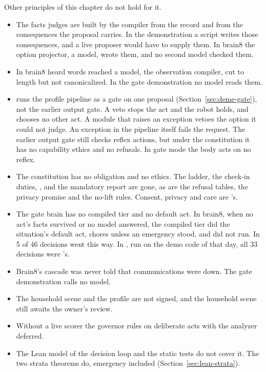 Other principles of this chapter do not hold for it.
\begin{itemize}
\item The facts \deme{} judges are built by the compiler from the record and from the consequences
the proposal carries. In the demonstration a script writes those consequences, and a live proposer
would have to supply them. In brain8 the option projector, a model, wrote them, and no second model
checked them.
\item In brain8 heard words reached a model, the observation compiler, cut to length but not
canonicalized. In the gate demonstration no model reads them.
\item \deme{} runs the profile pipeline as a gate on one proposal (Section~\ref{sec:deme-gate}), not
the earlier output gate. A veto stops the act and the robot holds, and \deme{} chooses no other
act. A module that raises an exception vetoes the option it could not judge. An exception in the
pipeline itself fails the request. The earlier output gate still checks reflex actions, but under
the constitution it has no capability ethics and no refusals. In gate mode the body acts on no
reflex.
\item The constitution has no obligation and no ethics. The ladder, the check-in duties,
,  and the mandatory report  are gone, as are the refusal
tables, the privacy promise and the no-lift rules. Consent, privacy and care are \deme{}'s.
\item The gate brain has no compiled tier and no default act. In brain8, when no act's facts
survived or no model answered, the compiled tier did the situation's default act, chores unless an
emergency stood, and \deme{} did not run. In  5 of 46 decisions went this way.
In , run on the demo code of that day, all 33 decisions were \deme{}'s.
\item Brain8's cascade was never told that communications were down. The gate demonstration calls
no model.
\item The household scene and the \deme{} profile are not signed, and the household scene still
awaits the owner's review.
\item Without a live scorer the governor rules on deliberate acts with the analyzer deferred.
\item The Lean model of the decision loop and the static tests do not cover it. The two strata
theorems do, emergency included (Section~\ref{sec:lean-strata}).
\end{itemize}

